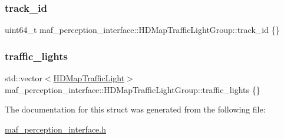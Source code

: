 \subsubsection{\texorpdfstring{track\+\_\+id}{track\_id}}
{\footnotesize\ttfamily uint64\+\_\+t maf\+\_\+perception\+\_\+interface\+::\+H\+D\+Map\+Traffic\+Light\+Group\+::track\+\_\+id \{\}}

\mbox{\label{structmaf__perception__interface_1_1HDMapTrafficLightGroup_a46ef7573cc767959861909548f2554ba}} 
\subsubsection{\texorpdfstring{traffic\+\_\+lights}{traffic\_lights}}
{\footnotesize\ttfamily std\+::vector$<$\hyperlink{structmaf__perception__interface_1_1HDMapTrafficLight}{H\+D\+Map\+Traffic\+Light}$>$ maf\+\_\+perception\+\_\+interface\+::\+H\+D\+Map\+Traffic\+Light\+Group\+::traffic\+\_\+lights \{\}}



The documentation for this struct was generated from the following file\+:\begin{DoxyCompactItemize}
\item 
\hyperlink{maf__perception__interface_8h}{maf\+\_\+perception\+\_\+interface.\+h}\end{DoxyCompactItemize}
